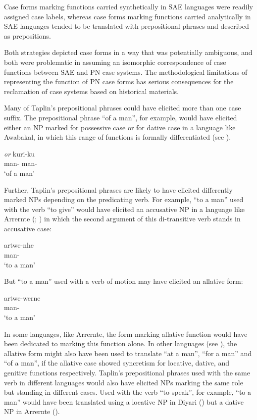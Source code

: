 Case forms marking functions carried synthetically in SAE languages were readily assigned case labels, whereas case forms marking functions carried analytically in SAE languages tended to be translated with prepositional phrases and described as prepositions.

Both strategies depicted case forms in a way that was potentially ambiguous, and both were problematic in assuming an isomorphic correspondence of case functions between SAE and PN case systems. The methodological limitations of representing the function of PN case forms has serious consequences for the reclamation of case systems based on historical materials. 

Many of Taplin’s prepositional phrases could have elicited more than one case suffix. The prepositional phrase “of a man'', for example, would have elicited either an NP marked for possessive case or for dative case in a language like Awabakal, in which this range of functions is formally differentiated (see ).

\ea
{} \textit{or} {kuri-ku}\\
{man-} {} {man-}\\
 {} {`of a man'}
\z

Further, Taplin’s prepositional phrases are likely to have elicited differently marked NPs depending on the predicating verb. For example, “to a man” used with the verb “to give” would have elicited an accusative NP in a language like Arrernte (\citealt[169]{wilkins_mparntwe_1989}; \citealt[294]{henderson_topics_2013}) in which the second argument of this di-transitive verb stands in accusative case: 

\ea
\gll artwe-nhe\\
man-\\
\glt `to a man'
\z

But “to a man” used with a verb of motion may have elicited an allative form: 

\ea
\gll artwe-werne\\
man-\\
\glt `to a man'
\z

In some languages, like Arrernte, the form marking allative function would have been dedicated to marking this function alone. In other languages (see \citealt[60]{blake_case_1977}), the allative form might also have been used to translate “at a man'', “for a man” and “of a man'', if the allative case showed syncretism for locative, dative, and genitive functions respectively. Taplin’s prepositional phrases used with the same verb in different languages would also have elicited NPs marking the same role but standing in different cases. Used with the verb “to speak'', for example, “to a man” would have been translated using a locative NP in Diyari (\citealt[131]{austin_grammar_2013}) but a dative NP in Arrernte (\citealt[179]{wilkins_mparntwe_1989}). 

